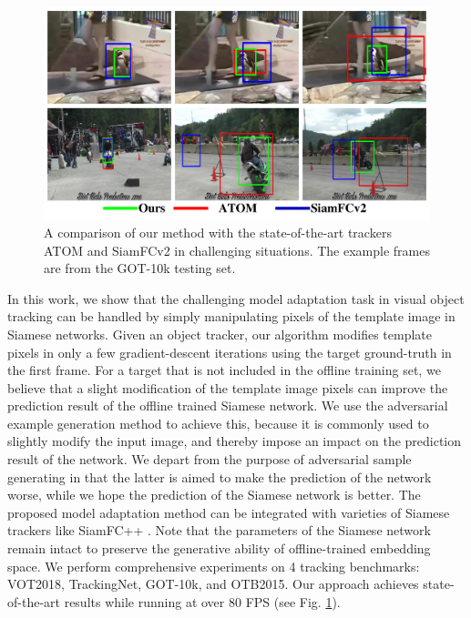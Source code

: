 \begin{figure}[t]
    \centering
    \includegraphics[width=1.0\textwidth]{Img/MTP/got10k/visulization2.pdf}
    \caption{A comparison of our method with the state-of-the-art trackers ATOM \cite{danelljan2019atom} and SiamFCv2 \cite{bertinetto2016fully} in challenging situations. The example frames are from the GOT-10k \cite{huang2018got} testing set.}
    \label{fig:vis}
\end{figure}

In this work, we show that the challenging model adaptation task in visual object tracking can be handled by simply manipulating pixels of the template image in Siamese networks. Given an object tracker, our algorithm modifies template pixels in only a few gradient-descent iterations using the target ground-truth in the first frame. For a target that is not included in the offline training set, we believe that a slight modification of the template image pixels can improve the prediction result of the offline trained Siamese network. We use the adversarial example generation method to achieve this, because it is commonly used to slightly modify the input image, and thereby impose an impact on the prediction result of the network. We depart from the purpose of adversarial sample generating in that the latter is aimed to make the prediction of the network worse, while we hope the prediction of the Siamese network is better. The proposed model adaptation method can be integrated with varieties of Siamese trackers like SiamFC++ \cite{SiamFC++}. Note that the parameters of the Siamese network remain intact to preserve the generative ability of offline-trained embedding space. We perform comprehensive experiments on 4 tracking benchmarks: VOT2018\cite{kristan2018sixth}, TrackingNet\cite{muller2018trackingnet}, GOT-10k\cite{huang2018got}, and OTB2015\cite{wu2013online}. Our approach achieves state-of-the-art results while running at over 80 FPS (see Fig. \ref{fig:vis}).

